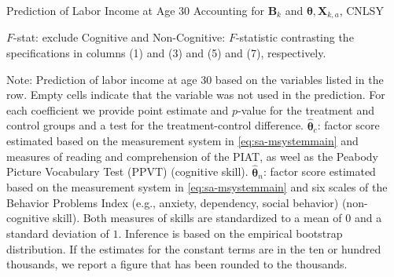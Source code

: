 \begin{table}
\begin{threeparttable}
\caption{Prediction of Labor Income at Age 30 Accounting for $\bm{B}_k$ and $\bm{\theta}, \bm{X}_{k,a}$, CNLSY}
\centering
\footnotesize

\begin{tablenotes}
\footnotesize
\item $F$-stat: exclude Cognitive and Non-Cognitive: $F$-statistic contrasting the specifications in columns (1) and (3) and (5) and (7), respectively.\\
\item Note: Prediction of labor income at age 30 based on the variables listed in the row. Empty cells indicate that the variable was not used in the prediction. For each coefficient we provide point estimate and $p$-value for the treatment and control groups and a test for the treatment-control difference. $\hat{\bm{\theta}}_{c}$: factor score estimated based on the measurement system in \eqref{eq:sa-msystemmain} and measures of reading and comprehension of the PIAT, as weel as the Peabody Picture Vocabulary Test (PPVT) (cognitive skill). $\hat{\bm{\theta}}_{n}$: factor score estimated based on the measurement system in \eqref{eq:sa-msystemmain} and six scales of the Behavior Problems Index (e.g., anxiety, dependency, social behavior) (non-cognitive skill). Both measures of skills are standardized to a mean of $0$ and a standard deviation of $1$. Inference is based on the empirical bootstrap distribution. If the estimates for the constant terms are in the ten or hundred thousands, we report a figure that has been rounded to the thousands.
\end{tablenotes}
\end{threeparttable}
\end{table}

